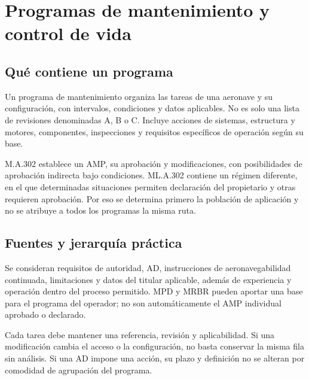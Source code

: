\chapter{Programas de mantenimiento y control de vida}\label{ch:17}
\section{Qué contiene un programa}
Un programa de mantenimiento organiza las tareas de una aeronave y su configuración, con intervalos, condiciones y datos aplicables. No es solo una lista de revisiones denominadas A, B o C. Incluye acciones de sistemas, estructura y motores, componentes, inspecciones y requisitos específicos de operación según su base.

M.A.302 establece un AMP, su aprobación y modificaciones, con posibilidades de aprobación indirecta bajo condiciones. ML.A.302 contiene un régimen diferente, en el que determinadas situaciones permiten declaración del propietario y otras requieren aprobación. Por eso se determina primero la población de aplicación y no se atribuye a todos los programas la misma ruta.
\section{Fuentes y jerarquía práctica}
Se consideran requisitos de autoridad, AD, instrucciones de aeronavegabilidad continuada, limitaciones y datos del titular aplicable, además de experiencia y operación dentro del proceso permitido. MPD y MRBR pueden aportar una base para el programa del operador; no son automáticamente el AMP individual aprobado o declarado.

Cada tarea debe mantener una referencia, revisión y aplicabilidad. Si una modificación cambia el acceso o la configuración, no basta conservar la misma fila sin análisis. Si una AD impone una acción, su plazo y definición no se alteran por comodidad de agrupación del programa.
